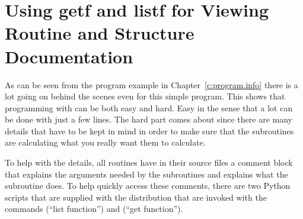 {{{{{{%
\section{Using getf and listf for Viewing Routine and Structure Documentation}
\label{s:getf}

As can be seen from the program example in Chapter~\ref{c:program.info}
there is a lot going on behind the scenes even for this
simple program. This shows that programming with \bmad can be both easy
and hard. Easy in the sense that a lot can be done with just a few
lines. The hard part comes about since there are many details that
have to be kept in mind in order to make sure that the subroutines
are calculating what you really want them to calculate.

To help with the details, all \bmad routines have in their source
files a comment block that explains the arguments needed by the
subroutines and explains what the subroutine does. To help quickly
access these comments, there are two Python scripts that are supplied
with the \bmad distribution that are invoked with the commands
 (``list function'') and  (``get function'').

}}}}}}
